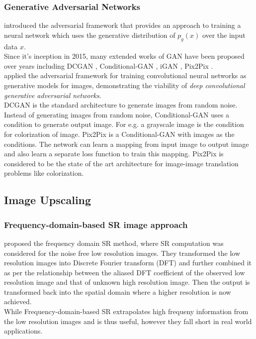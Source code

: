\documentclass{article} %
\begin{document}
\subsubsection{Generative Adversarial Networks}
\hspace*{0.25 in}\cite{goodfellow2014generative} introduced the adversarial framework that provides an approach to training a neural network which uses the generative distribution of $p_g(x)$ over the input data $x$.\\
    \hspace*{0.25 in}Since it's inception in 2015, many extended works of GAN have been proposed over years including DCGAN \citep{radford2016unsupervised}, Conditional-GAN \citep{mirza2014conditional}, iGAN \citep{zhu2018generative}, Pix2Pix \citep{isola2018imagetoimage}.\\
    \hspace*{0.25 in}\cite{radford2016unsupervised} applied the adversarial framework for training convolutional neural networks as generative models for images, demonstrating the viability of \textit{deep convolutional generative adversarial networks}.\\
    \hspace*{0.25 in}DCGAN is the standard architecture to generate images from random noise. Instead of generating images from random noise, Conditional-GAN \citep{mirza2014conditional} uses a condition to generate output image. For e.g. a grayscale image is the condition for colorization of image. Pix2Pix \citep{isola2018imagetoimage} is a Conditional-GAN with images as the conditions. The network can learn a mapping from input image to output image and also learn a separate loss function to train this mapping. Pix2Pix is considered to be the state of the art architecture for image-image translation problems like colorization.
    
\subsection{Image Upscaling}
\subsubsection{Frequency-domain-based SR image approach}
\hspace*{0.25 in} \cite{tsai1984multiframe} proposed the frequency domain SR method, where SR computation was considered for the noise free low resolution images. They transformed the low resolution images into Discrete Fourier transform (DFT) and further combined it as per the relationship between the aliased DFT coefficient of the observed low resolution image and that of unknown high resolution image. Then the output is transformed back into the spatial domain where a higher resolution is now achieved.\\
    \hspace*{0.25 in} While Frequency-domain-based SR extrapolates high frequeny information from the low resolution images and is thus useful, however they fall short in real world applications.\\
\end{document}
